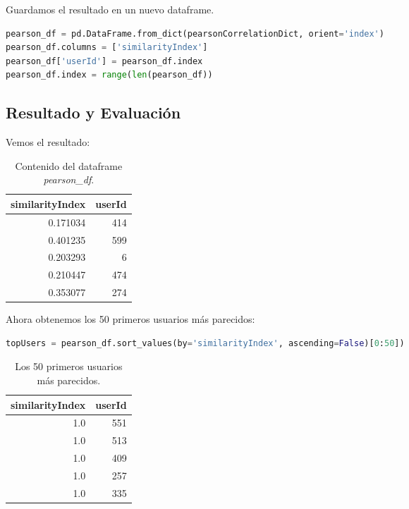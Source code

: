 \documentclass{uimppracticas}
\begin{document}
Guardamos el resultado en un nuevo dataframe.

\begin{lstlisting}[language=python]
pearson_df = pd.DataFrame.from_dict(pearsonCorrelationDict, orient='index')
pearson_df.columns = ['similarityIndex']
pearson_df['userId'] = pearson_df.index
pearson_df.index = range(len(pearson_df))
\end{lstlisting}

\newpage

\subsection{Resultado y Evaluación}

Vemos el resultado:

\begin{table}[h]
	\centering
	\begin{tabular}{rr}
		\toprule
		similarityIndex &  userId \\
		\midrule
		0.171034 &     414 \\
		0.401235 &     599 \\
		0.203293 &       6 \\
		0.210447 &     474 \\
		0.353077 &     274 \\
		\bottomrule
	\end{tabular}
	\caption{Contenido del dataframe \textit{pearson\_df}.}
	\label{pearson}
\end{table}

Ahora obtenemos los 50 primeros usuarios más parecidos:

\begin{lstlisting}[language=python]
topUsers = pearson_df.sort_values(by='similarityIndex', ascending=False)[0:50])
\end{lstlisting}

\begin{table}[h]
	\centering
	\begin{tabular}{rr}
		\toprule
		similarityIndex &  userId \\
		\midrule
		1.0 &     551 \\
		1.0 &     513 \\
		1.0 &     409 \\
		1.0 &     257 \\
		1.0 &     335 \\
		\bottomrule
	\end{tabular}
	\caption{Los 50 primeros usuarios más parecidos.}
	\label{usuarios_parecidos}
\end{table}
\end{document}
